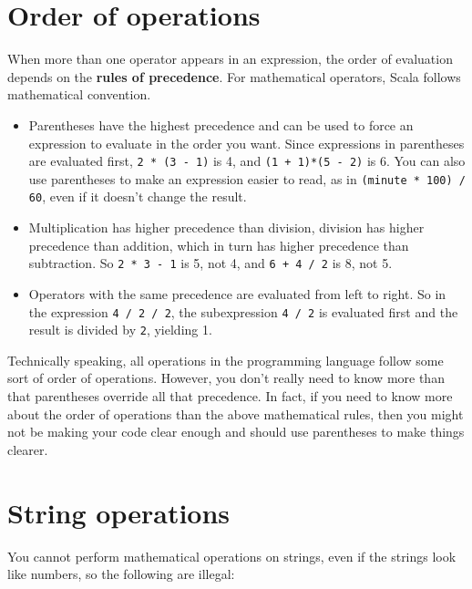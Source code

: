 \documentclass[10pt]{book}
\begin{document}
\section{Order of operations}

When more than one operator appears in an expression, the order of
evaluation depends on the {\bf rules of precedence}.  For
mathematical operators, Scala follows mathematical convention.


\begin{itemize}

\item Parentheses have the highest precedence and can be used 
to force an expression to evaluate in the order you want. Since
expressions in parentheses are evaluated first, {\tt 2 * (3 - 1)} is 4,
and {\tt (1 + 1)*(5 - 2)} is 6. You can also use parentheses to make an
expression easier to read, as in {\tt (minute * 100) / 60}, even
if it doesn't change the result.

\item Multiplication has higher precedence than division,
division has higher precedence than addition, which in turn has higher precedence than subtraction. So {\tt 2 * 3 - 1}
 is 5, not 4, and {\tt 6 + 4 / 2} is 8, not 5.

\item Operators with the same precedence are evaluated from left to 
right.  So in the expression {\tt 4 / 2 / 2}, the subexpression {\tt 4 / 2} is evaluated first and the result is
 divided by {\tt 2}, yielding 1.

\end{itemize}

Technically speaking, all operations in the programming language follow some sort
of order of operations. However, you don't really need to know more than that 
parentheses override all that precedence. In fact, if you need to know more about
the order of operations than the above mathematical rules, then you might not be making
your code clear enough and should use parentheses to make things clearer.

\section{String operations}

You cannot perform mathematical operations on strings, even
if the strings look like numbers, so the following are illegal:
\end{document}

